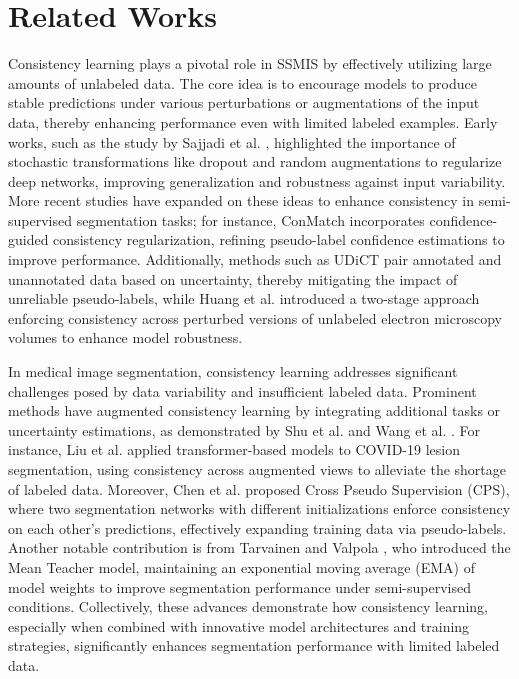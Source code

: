\section{Related Works}
Consistency learning plays a pivotal role in SSMIS by effectively utilizing large amounts of unlabeled data. The core idea is to encourage models to produce stable predictions under various perturbations or augmentations of the input data, thereby enhancing performance even with limited labeled examples. Early works, such as the study by Sajjadi et al. \cite{b7}, highlighted the importance of stochastic transformations like dropout and random augmentations to regularize deep networks, improving generalization and robustness against input variability. More recent studies have expanded on these ideas to enhance consistency in semi-supervised segmentation tasks; for instance, ConMatch\cite{b31} incorporates confidence-guided consistency regularization, refining pseudo-label confidence estimations to improve performance. Additionally, methods such as UDiCT\cite{b32} pair annotated and unannotated data based on uncertainty, thereby mitigating the impact of unreliable pseudo-labels, while Huang et al. \cite{b33} introduced a two-stage approach enforcing consistency across perturbed versions of unlabeled electron microscopy volumes to enhance model robustness.

In medical image segmentation, consistency learning addresses significant challenges posed by data variability and insufficient labeled data. Prominent methods have augmented consistency learning by integrating additional tasks or uncertainty estimations, as demonstrated by Shu et al. \cite{b34} and Wang et al. \cite{b35}. For instance, Liu et al. \cite{b36} applied transformer-based models to COVID-19 lesion segmentation, using consistency across augmented views to alleviate the shortage of labeled data. Moreover, Chen et al. \cite{b37} proposed Cross Pseudo Supervision (CPS), where two segmentation networks with different initializations enforce consistency on each other's predictions, effectively expanding training data via pseudo-labels. Another notable contribution is from Tarvainen and Valpola \cite{b9}, who introduced the Mean Teacher model, maintaining an exponential moving average (EMA) of model weights to improve segmentation performance under semi-supervised conditions. Collectively, these advances demonstrate how consistency learning, especially when combined with innovative model architectures and training strategies, significantly enhances segmentation performance with limited labeled data.




%